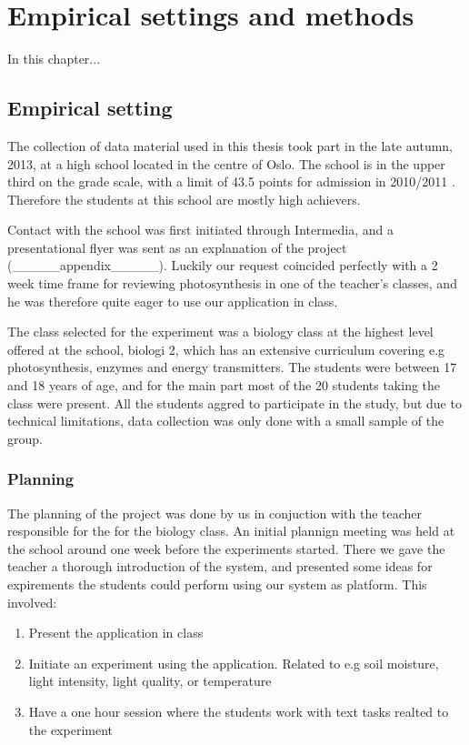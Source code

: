 \chapter{Empirical settings and methods}
In this chapter...

\section{Empirical setting}
The collection of data material used in this thesis took part in the late autumn, 2013, at a high school located in the centre of Oslo. The school is in the upper third on the grade scale, with a limit of 43.5 points for admission in 2010/2011 \citep{utdanningsetaten}. Therefore the students at this school are mostly high achievers. 

Contact with the school was first initiated through Intermedia, and a presentational flyer was sent as an explanation of the project (_____appendix_____). Luckily our request coincided perfectly with a 2 week time frame for reviewing photosynthesis in one of the teacher's classes, and he was therefore quite eager to use our application in class. 

The class selected for the experiment was a biology class at the highest level offered at the school, biologi 2, which has an extensive curriculum covering e.g photosynthesis, enzymes and energy transmitters. The students were between 17 and 18 years of age, and for the main part most of the 20 students taking the class were present. All the students aggred to participate in the study, but due to technical limitations, data collection was only done with a small sample of the group. 

\subsection{Planning}
The planning of the project was done by us in conjuction with the teacher responsible for the for the biology class. An initial plannign meeting was held at the school around one week before the experiments started. There we gave the teacher a thorough introduction of the system, and presented some ideas for expirements the students could perform using our system as platform. This involved:

\begin{enumerate}
\item{Present the application in class}
\item{Initiate an experiment using the application. Related to e.g soil moisture, light intensity, light quality, or temperature}
\item{Have a one hour session where the students work with text tasks realted to the experiment}
\end{enumerate}

